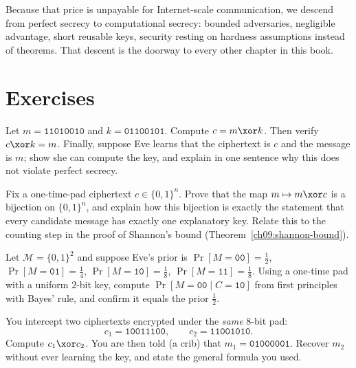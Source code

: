 Because that price is unpayable for Internet-scale communication, we descend from perfect secrecy to computational secrecy: bounded adversaries, negligible advantage, short reusable keys, security resting on hardness assumptions instead of theorems. That descent is the doorway to every other chapter in this book.

\section*{Exercises}

\begin{exercise}
\label{ch09:ex-xor}
Let $m = \texttt{11010010}$ and $k = \texttt{01100101}$. Compute $c = m \xor k$. Then verify $c \xor k = m$. Finally, suppose Eve learns that the ciphertext is $c$ and the message is $m$; show she can compute the key, and explain in one sentence why this does not violate perfect secrecy.
\end{exercise}

\begin{exercise}
\label{ch09:ex-reachable}
Fix a one-time-pad ciphertext $c \in \{0,1\}^n$. Prove that the map $m \mapsto m \xor c$ is a bijection on $\{0,1\}^n$, and explain how this bijection is exactly the statement that every candidate message has exactly one explanatory key. Relate this to the counting step in the proof of Shannon's bound (Theorem~\ref{ch09:shannon-bound}).
\end{exercise}

\begin{exercise}
\label{ch09:ex-bayes}
Let $\mathcal{M} = \{0,1\}^2$ and suppose Eve's prior is $\Pr[M=\texttt{00}]=\tfrac12$, $\Pr[M=\texttt{01}]=\tfrac14$, $\Pr[M=\texttt{10}]=\tfrac18$, $\Pr[M=\texttt{11}]=\tfrac18$. Using a one-time pad with a uniform $2$-bit key, compute $\Pr[M=\texttt{00}\mid C=\texttt{10}]$ from first principles with Bayes' rule, and confirm it equals the prior $\tfrac12$.
\end{exercise}

\begin{exercise}
\label{ch09:ex-twotime}
You intercept two ciphertexts encrypted under the \emph{same} 8-bit pad:
\[
  c_1 = \texttt{10011100}, \qquad c_2 = \texttt{11001010}.
\]
Compute $c_1 \xor c_2$. You are then told (a crib) that $m_1 = \texttt{01000001}$. Recover $m_2$ without ever learning the key, and state the general formula you used.
\end{exercise}

